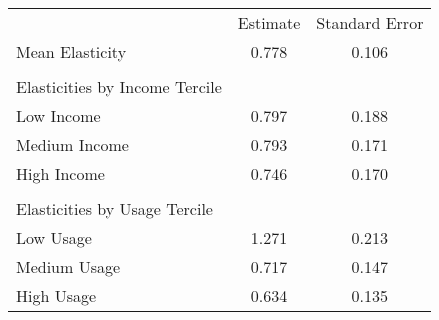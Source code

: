 \begin{tabular}{lcc}
& Estimate & Standard Error \\
Mean Elasticity &0.778&0.106\\
 & &  \\
Elasticities by Income Tercile & & \\
\hline
Low Income &0.797&0.188\\
Medium Income &0.793&0.171\\
High Income &0.746&0.170\\
 & &  \\
Elasticities by Usage Tercile & & \\
\hline
Low Usage &1.271&0.213\\
Medium Usage &0.717&0.147\\
High Usage &0.634&0.135\\
\end{tabular} 
